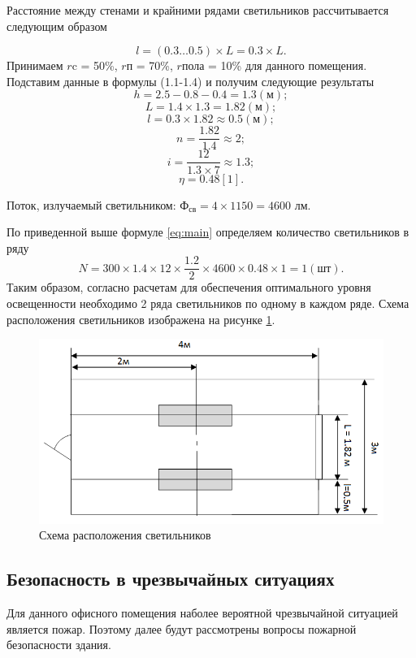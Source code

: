 Расстояние между стенами и крайними рядами светильников рассчитывается следующим образом

\begin{equation}\label{eq:length}
    l = (0.3 \ldots 0.5) \times L = 0.3 \times L.
\end{equation}
Принимаем $r{\text{c}}$ = 50\%, $r{\text{п}}$ = 70\%,  $r{\text{пола}}$ = 10\% для данного помещения.
Подставим данные в формулы (1.1-1.4) и получим следующие результаты
\[
    h = 2.5 - 0.8 - 0.4 = 1.3 (\text{м});
\]
\[
    L = 1.4 \times 1.3 = 1.82 (\text{м});
\]
\[
    l = 0.3 \times 1.82 \approx 0.5 (\text{м});
\]
\[
    n = \dfrac {1.82}{1.4} \approx 2;
\]
\[
    i = \dfrac {12}{1.3 \times 7} \approx 1.3;
\]
\[
    \eta = 0.48 [1].
\]

Поток, излучаемый светильником: ${\text{Ф}}_{\text{св}} = 4 \times 1150 = 4600$ лм.

По приведенной выше формуле \eqref{eq:main} определяем количество светильников в ряду
\[
    N = 300 \times 1.4 \times 12 \times {\dfrac{1.2}{2}} \times 4600 \times 0.48 \times 1 = 1 (\text{шт}).
\]
Таким образом, согласно расчетам для обеспечения оптимального уровня освещенности необходимо 2 ряда светильников по
одному в каждом ряде. Схема расположения светильников изображена на рисунке \ref{fig:torch}.

\begin{figure}[!ht]
    \centering
    \includegraphics[scale=0.4]{graphics/torch.png}
    \caption{Схема расположения светильников}
    \label{fig:torch}
\end{figure}

\subsection{Безопасность в чрезвычайных ситуациях}
Для данного офисного помещения наболее вероятной чрезвычайной ситуацией является пожар.
Поэтому далее будут рассмотрены вопросы пожарной безопасности здания.

